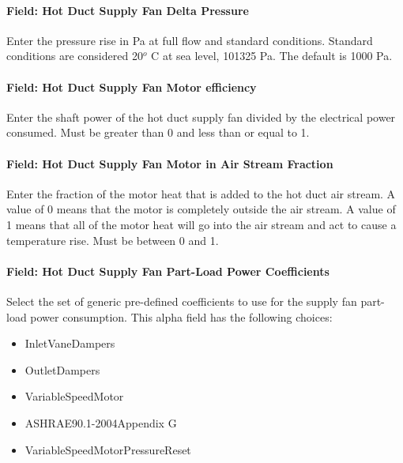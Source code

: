 \paragraph{Field: Hot Duct Supply Fan Delta Pressure}\label{field-hot-duct-supply-fan-delta-pressure}

Enter the pressure rise in Pa at full flow and standard conditions. Standard conditions are considered 20\(^{o}\) C at sea level, 101325 Pa. The default is 1000 Pa.

\paragraph{Field: Hot Duct Supply Fan Motor efficiency}\label{field-hot-duct-supply-fan-motor-efficiency}

Enter the shaft power of the hot duct supply fan divided by the electrical power consumed. Must be greater than 0 and less than or equal to 1.

\paragraph{Field: Hot Duct Supply Fan Motor in Air Stream Fraction}\label{field-hot-duct-supply-fan-motor-in-air-stream-fraction}

Enter the fraction of the motor heat that is added to the hot duct air stream. A value of 0 means that the motor is completely outside the air stream. A value of 1 means that all of the motor heat will go into the air stream and act to cause a temperature rise. Must be between 0 and 1.

\paragraph{Field: Hot Duct Supply Fan Part-Load Power Coefficients}\label{field-hot-duct-supply-fan-part-load-power-coefficients}

Select the set of generic pre-defined coefficients to use for the supply fan part-load power consumption. This alpha field has the following choices:

\begin{itemize}
\item
  InletVaneDampers
\item
  OutletDampers
\item
  VariableSpeedMotor
\item
  ASHRAE90.1-2004Appendix G
\item
  VariableSpeedMotorPressureReset
\end{itemize}


